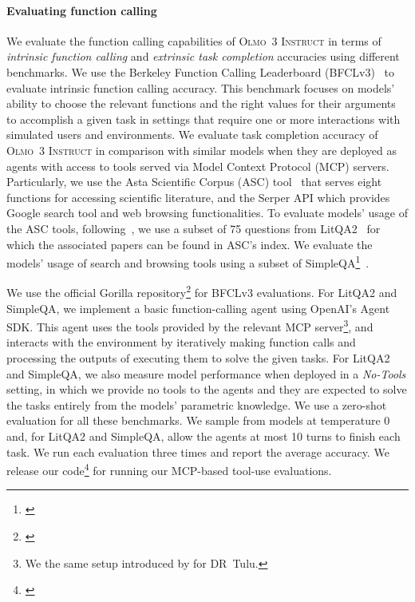 \documentclass[table]{ai2style/ai2}
\newcommand{\newOlmo}{Olmo\xspace}
\newcommand{\olmothreeinstruct}{\textsc{\newOlmo~3 Instruct}\xspace}
\begin{document}
{{\paragraph{Evaluating function calling} 
We evaluate the function calling capabilities of \olmothreeinstruct in terms of \textit{intrinsic function calling} and \textit{extrinsic task completion} accuracies using different benchmarks. We use the Berkeley Function Calling Leaderboard (BFCLv3)~\citep{patil2025bfcl} to evaluate intrinsic function calling accuracy. This benchmark focuses on models' ability to choose the relevant functions and the right values for their arguments to accomplish a given task in settings that require one or more interactions with simulated users and environments. We evaluate task completion accuracy of \olmothreeinstruct in comparison with similar models when they are deployed as agents with access to tools served via Model Context Protocol (MCP) servers. Particularly, we use the Asta Scientific Corpus (ASC) tool~\citep{bragg2025astabench} that serves eight functions for accessing scientific literature, and the Serper API which provides Google search tool and web browsing functionalities. To evaluate models' usage of the ASC tools, following~\citet{bragg2025astabench}, we use a subset of 75 questions from LitQA2~\citep{skarlinski2024language} for which the associated papers can be found in ASC's index. We evaluate the models' usage of search and browsing tools using a subset of SimpleQA\footnote{\href{https://huggingface.co/datasets/akariasai/sampled_simpleqa}{}}~\citep{wei2024measuring}.

We use the official Gorilla repository\footnote{\href{https://github.com/ShishirPatil/gorilla}{}} for BFCLv3 evaluations. For LitQA2 and SimpleQA, we implement a basic function-calling agent using OpenAI's Agent SDK. This agent uses the tools provided by the relevant MCP server\footnote{We the same setup introduced by \citet{drtulu} for DR~Tulu.}, and interacts with the environment by iteratively making function calls and processing the outputs of executing them to solve the given tasks.
For LitQA2 and SimpleQA, we also measure model performance when deployed in a \textit{No-Tools} setting, in which we provide no tools to the agents and they are expected to solve the tasks entirely from the models' parametric knowledge. We use a zero-shot evaluation for all these benchmarks. We sample from models at temperature 0 and, for LitQA2 and SimpleQA, allow the agents at most 10 turns to finish each task. We run each evaluation three times and report the average accuracy. We release our code\footnote{\href{https://github.com/allenai/mcp-tool-eval}{}} for running our MCP-based tool-use evaluations.

}}
\end{document}
